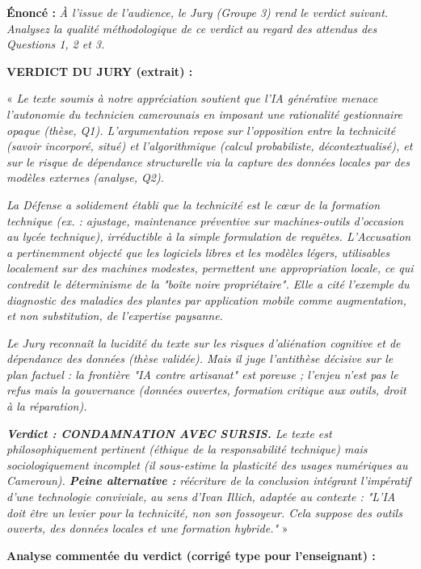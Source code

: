 \documentclass[11pt]{article}
\begin{document}
\begin{exoresolu}
\textbf{Énoncé :} \emph{À l'issue de l'audience, le Jury (Groupe 3) rend le verdict suivant. Analysez la qualité méthodologique de ce verdict au regard des attendus des Questions 1, 2 et 3.}

\textbf{VERDICT DU JURY (extrait) :}

« \emph{Le texte soumis à notre appréciation soutient que l'IA générative menace l'autonomie du technicien camerounais en imposant une rationalité gestionnaire opaque (thèse, Q1). L'argumentation repose sur l'opposition entre la technicité (savoir incorporé, situé) et l'algorithmique (calcul probabiliste, décontextualisé), et sur le risque de dépendance structurelle via la capture des données locales par des modèles externes (analyse, Q2).}

\emph{La Défense a solidement établi que la technicité est le c\oe ur de la formation technique (ex. : ajustage, maintenance préventive sur machines-outils d'occasion au lycée technique), irréductible à la simple formulation de requêtes. L'Accusation a pertinemment objecté que les logiciels libres et les modèles légers, utilisables localement sur des machines modestes, permettent une appropriation locale, ce qui contredit le déterminisme de la "boîte noire propriétaire". Elle a cité l'exemple du diagnostic des maladies des plantes par application mobile comme augmentation, et non substitution, de l'expertise paysanne.}

\emph{Le Jury reconnaît la lucidité du texte sur les risques d'aliénation cognitive et de dépendance des données (thèse validée). Mais il juge l'antithèse décisive sur le plan factuel : la frontière "IA contre artisanat" est poreuse ; l'enjeu n'est pas le refus mais la gouvernance (données ouvertes, formation critique aux outils, droit à la réparation).}

\emph{\textbf{Verdict : CONDAMNATION AVEC SURSIS.} Le texte est philosophiquement pertinent (éthique de la responsabilité technique) mais sociologiquement incomplet (il sous-estime la plasticité des usages numériques au Cameroun). \textbf{Peine alternative :} réécriture de la conclusion intégrant l'impératif d'une technologie conviviale, au sens d'Ivan Illich, adaptée au contexte : "L'IA doit être un levier pour la technicité, non son fossoyeur. Cela suppose des outils ouverts, des données locales et une formation hybride."} »

\tcblower
\textbf{Analyse commentée du verdict (corrigé type pour l'enseignant) :}


\end{exoresolu}
\end{document}
